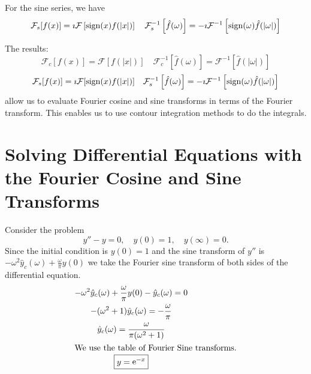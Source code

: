 For the sine series, we have
\[
\mathcal{F}_s[f(x)] = \imath \mathcal{F} \left[ \mathop{\mathrm{sign}}\nolimits(x) f(|x|) \right] \quad
\mathcal{F}_s^{-1} \left[ \hat{f}(\omega) \right] 
= - \imath \mathcal{F}^{-1} \left[ \mathop{\mathrm{sign}}\nolimits(\omega) \hat{f}(|\omega|) \right]
\]


\begin{Result}
  The results:
  \[
  \mathcal{F}_c[f(x)] = \mathcal{F}[f(|x|)] \quad
  \mathcal{F}_c^{-1} \left[ \hat{f}(\omega) \right] 
  = \mathcal{F}^{-1} \left[ \hat{f}(|\omega|) \right]
  \]
  \[
  \mathcal{F}_s[f(x)] = \imath \mathcal{F}[\mathop{\mathrm{sign}}\nolimits(x) f(|x|)] \quad
  \mathcal{F}_s^{-1} \left[ \hat{f}(\omega) \right] 
  = - \imath \mathcal{F}^{-1} \left[ \mathop{\mathrm{sign}}\nolimits(\omega) \hat{f}(|\omega|) \right]
  \]
  allow us to evaluate Fourier cosine and sine transforms in terms of
  the Fourier transform.  This enables us to use contour integration methods
  to do the integrals. 
\end{Result}










\section{Solving Differential Equations with the Fourier Cosine and Sine
  Transforms}






\begin{Example}
  Consider the problem
  \[ 
  y'' - y = 0, \quad y(0) = 1, \quad y(\infty) = 0. 
  \]
  Since the initial condition is $y(0) = 1$ and the sine transform of
  $y''$ is $-\omega^2 \hat{y}_c(\omega) + \frac{\omega}{\pi} y(0)$ we
  take the Fourier sine transform of both sides of the differential equation.
  \begin{gather*}
    -\omega^2 \hat{y}_c(\omega) + \frac{\omega}{\pi} y(0) - \hat{y}_c(\omega) = 0 
    \\
    -(\omega^2 + 1) \hat{y}_c(\omega) = -\frac{\omega}{\pi} 
    \\
    \hat{y}_c(\omega) = \frac{\omega}{\pi(\omega^2+1)}
    \\
    \intertext{We use the table of Fourier Sine transforms.}
    \boxed{
      y = \mathop{\mathrm{e}}\nolimits^{-x}
      }
  \end{gather*}
\end{Example}







